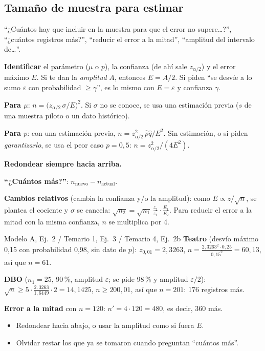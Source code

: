 \subsection{Tamaño de muestra para estimar}\label{p:nest}
\begin{cuando}
``¿Cuántos hay que incluir en la muestra para que el error no supere\ldots?'', ``¿cuántos registros más?'', ``reducir el error a la mitad'', ``amplitud del intervalo de\ldots''.
\end{cuando}
\begin{pasos}
\begin{pasolista}
\item \textbf{Identificar} el parámetro ($\mu$ o $p$), la confianza (de ahí sale $z_{\alpha/2}$) y el error máximo $E$. Si te dan la \emph{amplitud} $A$, entonces $E=A/2$. Si piden ``se desvíe a lo sumo $\varepsilon$ con probabilidad $\ge\gamma$'', es lo mismo con $E=\varepsilon$ y confianza $\gamma$.
\item \textbf{Para $\mu$}: $n=\big(z_{\alpha/2}\,\sigma/E\big)^2$. Si $\sigma$ no se conoce, se usa una estimación previa ($s$ de una muestra piloto o un dato histórico).
\item \textbf{Para $p$}: con una estimación previa, $n=z_{\alpha/2}^2\,\hat p\hat q/E^2$. Sin estimación, o si piden \emph{garantizarlo}, se usa el peor caso $p=0{,}5$: $n=z_{\alpha/2}^2/(4E^2)$.
\item \textbf{Redondear siempre hacia arriba.}
\item \textbf{``¿Cuántos más?''}: $n_{\text{nuevo}}-n_{\text{actual}}$.
\item \textbf{Cambios relativos} (cambia la confianza y/o la amplitud): como $E\propto z/\sqrt n$, se plantea el cociente y $\sigma$ se cancela: $\sqrt{n_2}=\sqrt{n_1}\,\frac{z_2}{z_1}\cdot\frac{E_1}{E_2}$. Para reducir el error a la mitad con la misma confianza, $n$ se multiplica por 4.
\end{pasolista}
\end{pasos}
\begin{modelo}{Modelo A, Ej.\ 2 / Temario 1, Ej.\ 3 / Temario 4, Ej.\ 2b}
\textbf{Teatro} (desvío máximo 0,15 con probabilidad 0,98, sin dato de $p$): $z_{0,01}=2{,}3263$, $n=\frac{2{,}3263^2\cdot0{,}25}{0{,}15^2}=60{,}13$, así que $n=61$.

\textbf{DBO} ($n_1=25$, 90\,\%, amplitud $\varepsilon$; se pide 98\,\% y amplitud $\varepsilon/2$): $\sqrt{n}\ge5\cdot\frac{2{,}3263}{1{,}6449}\cdot2=14{,}1425$, $n\ge200{,}01$, así que $n=201$: 176 registros más.

\textbf{Error a la mitad} con $n=120$: $n'=4\cdot120=480$, es decir, 360 más.
\end{modelo}
\begin{ojo}
\begin{itemize}
\item Redondear hacia abajo, o usar la amplitud como si fuera $E$.
\item Olvidar restar los que ya se tomaron cuando preguntan ``cuántos más''.
\end{itemize}
\end{ojo}
